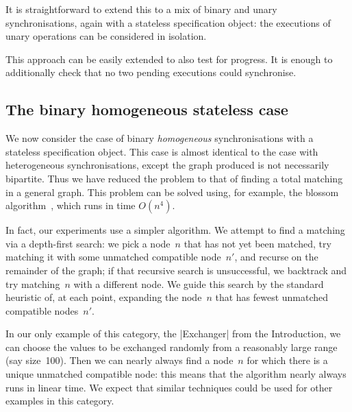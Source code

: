 It is straightforward to extend this to a mix of binary and unary
synchronisations, again with a stateless specification object: the executions
of unary operations can be considered in isolation.  

This approach can be easily extended to also test for progress.  It is enough
to additionally check that no two pending executions could synchronise.


\subsection{The binary homogeneous stateless case}
\label{sec:binary-homogeneous} 

We now consider the case of binary \emph{homogeneous} synchronisations with a
stateless specification object.  This case is almost identical to the case
with heterogeneous synchronisations, except the graph produced is not
necessarily bipartite.  Thus we have reduced the problem to that of finding a
total matching in a general graph.  This problem can be solved using, for
example, the blossom algorithm~\cite{edmonds_1965}, which runs in time
$O(n^4)$.
  


In fact, our experiments use a simpler algorithm.  We attempt to find a
matching via a depth-first search: we pick a node~$n$ that has not yet been
matched, try matching it with some unmatched compatible node~$n'$, and recurse
on the remainder of the graph; if that recursive search is unsuccessful, we
backtrack and try matching~$n$ with a different node.  We guide this search by
the standard heuristic of, at each point, expanding the node~$n$ that has
fewest unmatched compatible nodes~$n'$.  

In our only example of this category, the |Exchanger| from the Introduction,
we can choose the values to be exchanged randomly from a reasonably large
range (say size~100).  Then we can nearly always find a node~$n$ for which
there is a unique unmatched compatible node: this means that the algorithm
nearly always runs in linear time.  We expect that similar techniques could be
used for other examples in this category.


